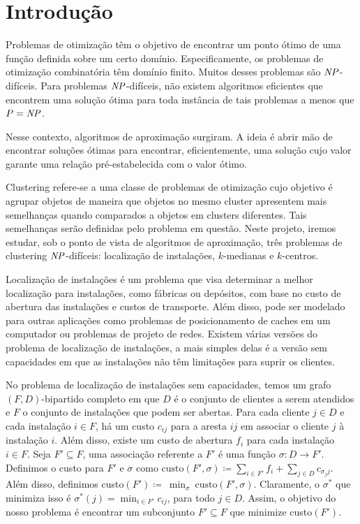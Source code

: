 \documentclass[12pt]{article}
\begin{document}
\section{Introdução}

Problemas de otimização têm o objetivo de encontrar um ponto ótimo de uma função definida sobre um certo domínio. Especificamente, os problemas de otimização combinatória têm domínio finito. Muitos desses problemas são $\mathit{NP}$-difíceis. Para problemas $\mathit{NP}$-difíceis, não existem algoritmos eficientes que encontrem uma solução ótima para toda instância de tais problemas a menos que $P = \mathit{NP}$.

Nesse contexto, algoritmos de aproximação surgiram. A ideia é abrir mão de encontrar soluções ótimas para encontrar, eficientemente, uma solução cujo valor garante uma relação pré-estabelecida com o valor ótimo. 

Clustering refere-se a uma classe de problemas de otimização cujo objetivo é agrupar objetos de maneira que objetos no mesmo cluster apresentem mais semelhanças quando comparados a objetos em clusters diferentes. Tais semelhanças serão definidas pelo problema em questão. Neste projeto, iremos estudar, sob o ponto de vista de algoritmos de aproximação, três problemas de clustering $\mathit{NP}$-difíceis: localização de instalações, $k$-medianas e $k$-centros. 

Localização de instalações é um problema que visa determinar a melhor localização para instalações, como fábricas ou depósitos, com base no custo de abertura das instalações e custos de transporte. Além disso, pode ser modelado para outras aplicações como problemas de posicionamento de caches em um computador ou problemas de projeto de redes.
Existem várias versões do problema de localização de instalações, a mais simples delas é a versão sem capacidades em que as instalações não têm limitações para suprir os clientes.

No problema de localização de instalações sem capacidades, temos um grafo $(F,D)$-bipartido completo em que $D$ é o conjunto de clientes a serem atendidos e $F$ o conjunto de instalações que podem ser abertas. Para cada cliente $j \in D$ e cada instalação $i \in F$, há um custo $c_{ij}$ para a aresta $ij$ em associar o cliente $j$ à instalação $i$. Além disso, existe um custo de abertura $f_i$ para cada instalação $i \in F$. Seja $F' \subseteq F$, uma associação referente a $F'$ é uma função $\sigma : D \to F'$. Definimos o custo para $F'$ e $\sigma$ como $\text{custo}(F',\sigma)\coloneqq \sum_{ i \in F'} f_i + \sum_{j \in D} c_{\sigma_{j}j}$. Além disso, definimos custo$(F') \coloneqq~\min_{\sigma}~\text{custo}(F',\sigma)$. Claramente, o $\sigma^*$ que minimiza isso é $\sigma^*(j) = \min_{i \in F'} c_{ij}$, para todo $j \in D$. Assim, o objetivo do nosso problema é encontrar um subconjunto $F' \subseteq F$ que minimize custo$(F')$.
\end{document}
